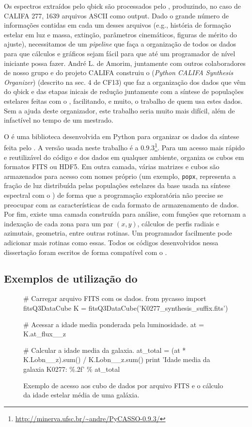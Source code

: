 Os espectros extraídos pelo {\sc qbick} são processados pelo \starlight, produzindo, no caso de CALIFA 277, 1639
arquivos ASCII como output. Dado o grande número de informações contidas em cada um desses arquivos (e.g., história de
formação estelar em luz e massa, extinção, parâmetros cinemáticos, figuras de mérito do ajuste), necessitamos de um
{\em pipeline} que faça a organização de todos os dados para que cálculos e gráficos sejam fácil para que até um programador
de nível iniciante possa fazer. André L. de Amorim, juntamente com outros colaboradores de nosso grupo e do projeto
CALIFA construiu o \pycasso ({\em Python CALIFA \starlight Synthesis Organizer}) (descrito na sec. 4 de CF13) que faz a
organização dos dados que vêm do {\sc qbick} e das etapas inicais de redução juntamente com a síntese de populações
estelares feitas com o \starlight, facilitando, e muito, o trabalho de quem usa estes dados. Sem a ajuda deste
organizador, este trabalho seria muito mais difícil, além de infactível no tempo de um mestrado.

O \pycasso é uma biblioteca desenvolvida em Python para organizar os dados da síntese feita pelo \starlight. A versão
usada neste trabalho é a $0.9.3$\footnote{\url{http://minerva.ufsc.br/~andre/PyCASSO-0.9.3/}}. Para um acesso mais
rápido e reutilizável do código e dos dados em qualquer ambiente, organiza os cubos em formatos FITS ou HDF5. Em outra
camada, várias matrizes e cubos são armazenados para acesso com nomes próprio (um exemplo, \texttt{popx}, representa a
fração de luz distribuída pelas populações estelares da base usada na síntese espectral com o \starlight) de forma que a
programação exploratória não precise se preocupar com as características de cada formato de armazenamento de dados. Por
fim, existe uma camada construída para análise, com funções que retornam a indexação de cada zona para um par $(x, y)$,
cálculos de perfis radiais e azimutais, geometria, entre outras rotinas. Um programador facilmente pode adicionar mais
rotinas como essas. Todos os códigos desenvolvidos nessa dissertação foram escritos de forma compatível com o \pycasso.

\subsection{Exemplos de utilização do \pycasso}

\begin{figure}
	\begin{python}
# Carregar arquivo FITS com os dados.
from pycasso import fitsQ3DataCube
K = fitsQ3DataCube('K0277_synthesis_suffix.fits')

# Acessar a idade media ponderada pela luminosidade.
at = K.at_flux__z

# Calcular a idade media da galaxia.
at_total = (at * K.Lobn__z).sum() / K.Lobn__z.sum()
print 'Idade media da galaxia K0277: \%.2f' \% at_total
	\end{python}
	\caption[Exemplo de programa utilizando \pycasso.]
	{Exemplo de acesso aos cubo de dados por arquivo FITS e o cálculo da idade estelar média de uma galáxia.}
	\label{fig:dataAccess}
\end{figure}

